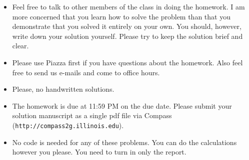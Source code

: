 


\usepackage{graphicx,amsmath,amssymb,url,epstopdf}
\sloppy
\oddsidemargin 0in
\evensidemargin 0in
\textwidth 6.5in
\topmargin -0.5in
\textheight 9.0in

\newcommand{\bb}[1]{\bf #1}
\newcommand{\ignore}[1]{}
\newcommand{\pp}{\noindent}
\newcommand{\ov}{\overline}
\renewcommand{\labelitemii}{\tiny$\circ$}



\begin{footnotesize}
\begin{itemize}

\item Feel free to talk to other members of the class in doing the homework.  I am
more concerned that you learn how to solve the problem than that you
demonstrate that you solved it entirely on your own.  You should, however,
write down your solution yourself.  Please try to keep the solution brief and
clear.
\item Please use Piazza first if you have questions about the homework.
  Also feel free to send us e-mails and come to office hours.

\item Please, no handwritten solutions.

\item The homework is due at 11:59 PM on the due date. Please submit your solution manuscript as a single pdf file via Compass
(\texttt{http://compass2g.illinois.edu}).

\item No code is needed for any of these problems. You can do the
calculations however you please. You need to turn in only the report.

\end{itemize}
\end{footnotesize}

